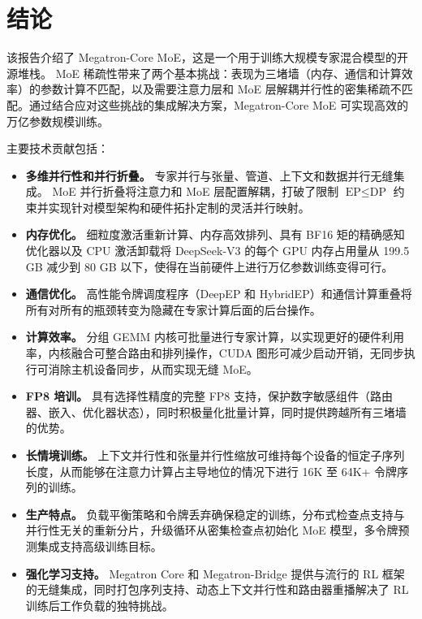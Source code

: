 \documentclass[10pt,logo,copyright]{nvidiatechreport_zh}
\begin{document}
\section{结论}
该报告介绍了 Megatron-Core MoE，这是一个用于训练大规模专家混合模型的开源堆栈。 MoE 稀疏性带来了两个基本挑战：表现为三堵墙（内存、通信和计算效率）的参数计算不匹配，以及需要注意力层和 MoE 层解耦并行性的密集稀疏不匹配。通过结合应对这些挑战的集成解决方案，Megatron-Core MoE 可实现高效的万亿参数规模训练。

主要技术贡献包括：
\begin{itemize}
    \item \textbf{多维并行性和并行折叠。} 专家并行与张量、管道、上下文和数据并行无缝集成。 MoE 并行折叠将注意力和 MoE 层配置解耦，打破了限制 $\text{EP} \leq \text{DP}$ 约束并实现针对模型架构和硬件拓扑定制的灵活并行映射。

    \item \textbf{内存优化。} 细粒度激活重新计算、内存高效排列、具有 BF16 矩的精确感知优化器以及 CPU 激活卸载将 DeepSeek-V3 的每个 GPU 内存占用量从 199.5 GB 减少到 80 GB 以下，使得在当前硬件上进行万亿参数训练变得可行。

    \item \textbf{通信优化。} 高性能令牌调度程序（DeepEP 和 HybridEP）和通信计算重叠将所有对所有的瓶颈转变为隐藏在专家计算后面的后台操作。

    \item \textbf{计算效率。} 分组 GEMM 内核可批量进行专家计算，以实现更好的硬件利用率，内核融合可整合路由和排列操作，CUDA 图形可减少启动开销，无同步执行可消除主机设备同步，从而实现无缝 MoE。

    \item \textbf{FP8 培训。} 具有选择性精度的完整 FP8 支持，保护数字敏感组件（路由器、嵌入、优化器状态），同时积极量化批量计算，同时提供跨越所有三堵墙的优势。

    \item \textbf{长情境训练。} 上下文并行性和张量并行性缩放可维持每个设备的恒定子序列长度，从而能够在注意力计算占主导地位的情况下进行 16K 至 64K+ 令牌序列的训练。

    \item \textbf{生产特点。} 负载平衡策略和令牌丢弃确保稳定的训练，分布式检查点支持与并行性无关的重新分片，升级循环从密集检查点初始化 MoE 模型，多令牌预测集成支持高级训练目标。

    \item \textbf{强化学习支持。} Megatron Core 和 Megatron-Bridge 提供与流行的 RL 框架的无缝集成，同时打包序列支持、动态上下文并行性和路由器重播解决了 RL 训练后工作负载的独特挑战。
\end{itemize}
\end{document}
